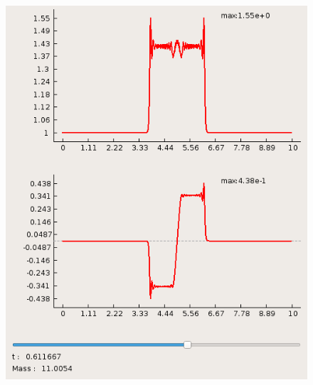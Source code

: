 \documentclass[a4paper, 11pt]{article}
\begin{document}
\begin{figure}[h]
\begin{minipage}[h] {0.49\linewidth}
	\end{minipage}
		\begin{minipage}[h] {0.49\linewidth}
		\includegraphics[width=1\linewidth]{p1/p1_t=0,611.png}
	\end{minipage}
	\end{figure}
	\newpage
\end{document}
